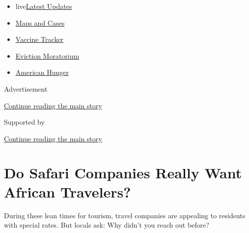 \begin{itemize}
\tightlist
\item
  live\href{https://www.nytimes3xbfgragh.onion/2020/09/07/world/covid-19-coronavirus.html?name=styln-coronavirus-national\&region=TOP_BANNER\&block=storyline_menu_recirc\&action=click\&pgtype=Article\&impression_id=805bfd91-f1ad-11ea-b69e-dd4be0f736de\&variant=undefined}{Latest
  Updates}
\item
  \href{https://www.nytimes3xbfgragh.onion/interactive/2020/us/coronavirus-us-cases.html?name=styln-coronavirus-national\&region=TOP_BANNER\&block=storyline_menu_recirc\&action=click\&pgtype=Article\&impression_id=805bfd92-f1ad-11ea-b69e-dd4be0f736de\&variant=undefined}{Maps
  and Cases}
\item
  \href{https://www.nytimes3xbfgragh.onion/interactive/2020/science/coronavirus-vaccine-tracker.html?name=styln-coronavirus-national\&region=TOP_BANNER\&block=storyline_menu_recirc\&action=click\&pgtype=Article\&impression_id=805bfd93-f1ad-11ea-b69e-dd4be0f736de\&variant=undefined}{Vaccine
  Tracker}
\item
  \href{https://www.nytimes3xbfgragh.onion/2020/09/02/your-money/eviction-moratorium-covid.html?name=styln-coronavirus-national\&region=TOP_BANNER\&block=storyline_menu_recirc\&action=click\&pgtype=Article\&impression_id=805bfd94-f1ad-11ea-b69e-dd4be0f736de\&variant=undefined}{Eviction
  Moratorium}
\item
  \href{https://www.nytimes3xbfgragh.onion/interactive/2020/09/02/magazine/food-insecurity-hunger-us.html?name=styln-coronavirus-national\&region=TOP_BANNER\&block=storyline_menu_recirc\&action=click\&pgtype=Article\&impression_id=805c24a0-f1ad-11ea-b69e-dd4be0f736de\&variant=undefined}{American
  Hunger}
\end{itemize}

Advertisement

\protect\hyperlink{after-top}{Continue reading the main story}

Supported by

\protect\hyperlink{after-sponsor}{Continue reading the main story}

\hypertarget{do-safari-companies-really-want-african-travelers}{%
\section{Do Safari Companies Really Want African
Travelers?}\label{do-safari-companies-really-want-african-travelers}}

During these lean times for tourism, travel companies are appealing to
residents with special rates. But locals ask: Why didn't you reach out
before?

